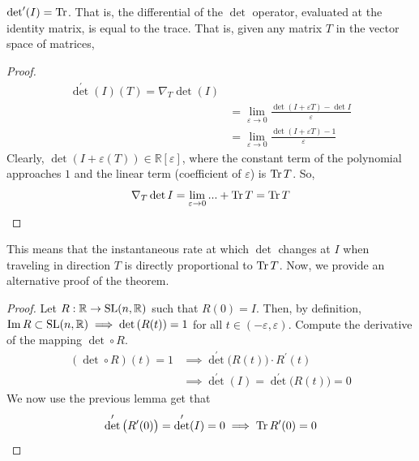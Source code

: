   \begin{lemma}
    $\det^\prime (I) = \operatorname{Tr}$. That is, the differential of the $\det$ operator, evaluated at the identity matrix, is equal to the trace. That is, given any matrix $T$ in the vector space of matrices, 
  \end{lemma}
  \begin{proof}
    \begin{align*}
      \det^\prime (I) (T) = \nabla_T \det(I) \\
      & = \lim_{\varepsilon \rightarrow 0} \frac{\det{(I + \varepsilon T)} - \det{I}}{\varepsilon} \\
      & = \lim_{\varepsilon \rightarrow 0} \frac{\det{(I + \varepsilon T)} - 1}{\varepsilon}
    \end{align*}
    Clearly, $\det(I + \varepsilon(T)) \in \mathbb{R}[\varepsilon]$, where the constant term of the polynomial approaches $1$ and the linear term (coefficient of $\varepsilon$) is $\operatorname{Tr}{T}$. So, 
    \begin{equation}
      \nabla_T \det{I} = \lim_{\varepsilon \rightarrow 0} ... + \operatorname{Tr}{T} = \operatorname{Tr}{T}
    \end{equation}
  \end{proof}

  This means that the instantaneous rate at which $\det$ changes at $I$ when traveling in direction $T$ is directly proportional to $\operatorname{Tr}{T}$. Now, we provide an alternative proof of the theorem. 
  \begin{proof}
    Let $R: \mathbb{R} \rightarrow \operatorname{SL}(n, \mathbb{R})$ such that $R(0) = I$. Then, by definition, $\operatorname{Im}{R} \subset \operatorname{SL}(n, \mathbb{R}) \implies \det{(R(t))} = 1$ for all $t \in (-\varepsilon, \varepsilon)$. Compute the derivative of the mapping $\det \circ R$. 
    \begin{align*}
        (\det \circ  R) (t) = 1 & \implies \det^\prime \big( R(t) \big) \cdot R^\prime (t) \\ 
        & \implies \det^\prime (I) = \det^\prime \big(R(t)\big) = 0 
    \end{align*}
    We now use the previous lemma get that 
    \begin{equation}
      \det^\prime \big( R^\prime(0)\big) = \det^\prime (I)=0 \implies \operatorname{Tr}{R^\prime(0)} = 0
    \end{equation}
  \end{proof} 

